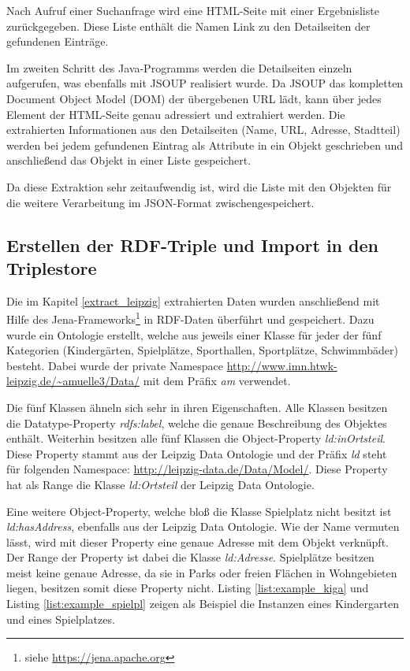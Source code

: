 \documentclass[parskip]{scrartcl}
\begin{document}
Nach Aufruf einer Suchanfrage wird eine HTML-Seite mit einer Ergebnisliste zurückgegeben. Diese Liste enthält die Namen Link zu den Detailseiten der gefundenen Einträge.

Im zweiten Schritt des Java-Programms werden die Detailseiten einzeln aufgerufen, was ebenfalls mit JSOUP realisiert wurde. Da JSOUP das kompletten Document Object Model (DOM) der übergebenen URL lädt, kann über  jedes Element der HTML-Seite genau adressiert und extrahiert werden. Die extrahierten Informationen aus den Detailseiten (Name, URL, Adresse, Stadtteil) werden bei jedem gefundenen Eintrag als Attribute in ein Objekt geschrieben und anschließend das Objekt in einer Liste gespeichert.

Da diese Extraktion sehr zeitaufwendig ist, wird die Liste mit den Objekten für die weitere Verarbeitung im JSON-Format zwischengespeichert.
 

\subsection{Erstellen der RDF-Triple und Import in den Triplestore}
Die im Kapitel \ref{extract_leipzig} extrahierten Daten wurden anschließend mit Hilfe des Jena-Frameworks\footnote{siehe \url{https://jena.apache.org}} in RDF-Daten überführt und gespeichert. Dazu wurde ein Ontologie erstellt, welche aus jeweils einer Klasse für jeder der fünf Kategorien (Kindergärten, Spielplätze, Sporthallen, Sportplätze, Schwimmbäder) besteht. Dabei wurde der private Namespace \url{http://www.imn.htwk-leipzig.de/~amuelle3/Data/} mit dem Präfix \textit{am} verwendet.

Die fünf Klassen ähneln sich sehr in ihren Eigenschaften. Alle Klassen besitzen die Datatype-Property \textit{rdfs:label}, welche die genaue Beschreibung des Objektes enthält. Weiterhin besitzen alle fünf Klassen die Object-Property \textit{ld:inOrtsteil}. Diese Property stammt aus der Leipzig Data Ontologie und der Präfix \textit{ld } steht für folgenden Namespace: \url{http://leipzig-data.de/Data/Model/}. Diese Property hat als Range die Klasse \textit{ld:Ortsteil} der Leipzig Data Ontologie.

Eine weitere Object-Property, welche bloß die Klasse Spielplatz nicht besitzt ist \textit{ld:hasAddress}, ebenfalls aus der Leipzig Data Ontologie. Wie der Name vermuten lässt, wird mit dieser Property eine genaue Adresse mit dem Objekt verknüpft. Der Range der Property ist dabei die Klasse \textit{ld:Adresse}. Spielplätze besitzen meist keine genaue Adresse, da sie in Parks oder freien Flächen in Wohngebieten liegen, besitzen somit diese Property nicht. Listing \ref{list:example_kiga} und Listing \ref{list:example_spielpl} zeigen als Beispiel die Instanzen eines Kindergarten und eines Spielplatzes.
\end{document}
